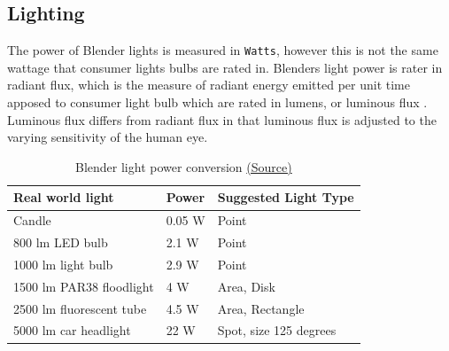 \documentclass[11pt]{article}
\begin{document}
\subsection{Lighting}
\label{sec:orgc3b815b}
The power of Blender lights is measured in \texttt{Watts}, however this is not the same
wattage that consumer lights bulbs are rated in. Blenders light power is rater
in radiant flux, which is the measure of radiant energy emitted per unit time
apposed to consumer light bulb which are rated in lumens, or luminous flux
\cite{radiant-flux,luminous-flux}. Luminous flux differs from radiant flux in that
luminous flux is adjusted to the varying sensitivity of the human eye.
\cite{luminous-flux}

\begin{table}[htbp]
\caption{Blender light power conversion \href{https://docs.blender.org/manual/en/latest/render/lights/light\_object.html\#power-of-lights}{(Source)}}
\centering
\begin{tabular}{lll}
\hline
\textbf{Real world light} & \textbf{Power} & \textbf{Suggested Light Type}\\
\hline
Candle & 0.05 W & Point\\
\hline
800 lm LED bulb & 2.1 W & Point\\
\hline
1000 lm light bulb & 2.9 W & Point\\
\hline
1500 lm PAR38 floodlight & 4 W & Area, Disk\\
\hline
2500 lm fluorescent tube & 4.5 W & Area, Rectangle\\
\hline
5000 lm car headlight & 22 W & Spot, size 125 degrees\\
\hline
\end{tabular}
\end{table}
\end{document}
